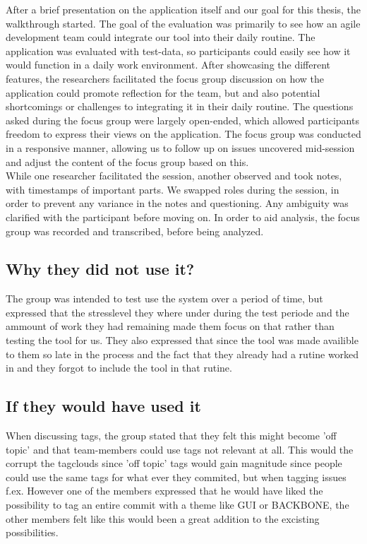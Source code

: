 After a brief presentation on the application itself and our goal for this thesis, the walkthrough started. The goal of the evaluation was primarily to see how an agile development team could integrate our tool into their daily routine. The application was evaluated with test-data, so participants could easily see how it would function in a daily work environment. After showcasing the different features, the researchers facilitated the focus group discussion on how the application could promote reflection for the team, but and also potential shortcomings or challenges to integrating it in their daily routine. The questions asked during the focus group were largely open-ended, which allowed participants freedom to express their views on the application\cite{yin2008case}. The focus group was conducted in a responsive manner, allowing us to follow up on issues uncovered mid-session and adjust the content of the focus group based on this\cite{rubin2011qualitative, wengraf2001qualitative}.\\
While one researcher facilitated the session, another observed and took notes, with timestamps of important parts. We swapped roles during the session, in order to prevent any variance in the notes and questioning. Any ambiguity was clarified with the participant before moving on. In order to aid analysis, the focus group was recorded and transcribed, before being analyzed. 

\subsection{Why they did not use it?}
The group was intended to test use the system over a period of time, but expressed that the stresslevel they where under during the test periode and the ammount of work they had remaining made them focus on that rather than testing the tool for us. They also expressed that since the tool was made availible to them so late in the process and the fact that they already had a rutine worked in and they forgot to include the tool in that rutine.

\subsection{If they would have used it}
When discussing tags, the group stated that they felt this might become 'off topic' and that team-members could use tags not relevant at all. This would the corrupt the tagclouds since 'off topic' tags would gain magnitude since people could use the same tags for what ever they commited, but when tagging issues f.ex. However one of the members expressed that he would have liked the possibility to tag an entire commit with a theme like GUI or BACKBONE, the other members felt like this would been a great addition to the excisting possibilities.

